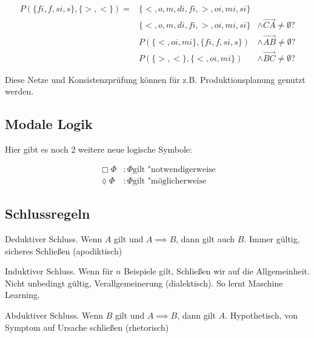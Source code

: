 \documentclass[a4paper]{article}
\begin{document}
\begin{center}
\end{center}

\begin{align*}
    P(\{fi, f, si, s\}, \{>, <\}) = &\{<, o, m, di, fi, >, oi, mi, si\}&\\
    &\{<, o, m, di, fi, >, oi, mi, si\} &\land \overrightarrow{CA} \neq \emptyset ?\\
    &P(\{<, oi, mi\}, \{fi,f, si, s\}) &\land \overrightarrow{AB} \neq \emptyset ?\\
    &P(\{>, <\}, \{<, oi, mi\}) &\land \overrightarrow{BC} \neq \emptyset ?
\end{align*}

Diese Netze und Konsistenzprüfung können für z.B. Produktionsplanung genutzt werden.

\subsection{Modale Logik}

Hier gibt es noch 2 weitere neue logische Symbole:

\begin{align*}
    \Box \Phi&: \Phi \text{gilt "notwendigerweise}\\
    \lozenge \Phi&: \Phi \text{gilt "möglicherweise}
\end{align*}

\subsection{Schlussregeln}

Deduktiver Schluss. Wenn $A$ gilt und $A\implies B$, dann gilt auch $B$. Immer gültig, sicheres Schließen (apodiktisch)

Induktiver Schluss. Wenn für $n$ Beispiele gilt, Schließen wir auf die Allgemeinheit. Nicht unbedingt gültig, Verallgemeinerung (dialektisch). So lernt Maschine Learning.

Abduktiver Schluss. Wenn $B$ gilt und $A\implies B$, dann gilt $A$. Hypothetisch, von Symptom auf Ursache schließen (rhetorisch)
\end{document}
